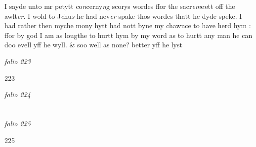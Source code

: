 \documentclass[12pt, a4paper]{book}
\begin{document}
		\ifthenelse{\isodd{\thepage}}
		{\reversemarginpar}
		{\normalmarginpar}
		I sayde unto mr petytt co\textit{n}cerny\textit{n}g scorys wordes ffor the sacr\textit{em}e\textit{n}tt
off the awlt\textit{er}. I wold to J\textit{e}hu\textit{s} he had nev\textit{er} spake thos wordes
thatt he dyde speke. I had rather then myche mony hytt had 
nott byne my chawnce to have herd hym : ffor by god I am
as lougthe to hurtt hym by my word as to hurtt any man 
he can doo evell yff he wyll. \& soo well as none? better
yff he lyst

\dotfill
						\newpage
{}

\textit{folio 223}


\begin{flushright}{\color{Mahogany}223}\end{flushright}

\dotfill
						\newpage
{}

\textit{folio 224}


         \vspace*{4cm}
         
\dotfill
						  \section*{}

\textit{folio 225}



\begin{flushright}{\color{Mahogany}225}\end{flushright}
\end{document}
